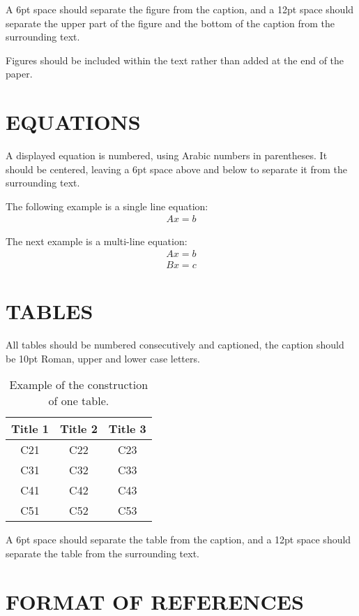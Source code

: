\documentclass{uncecomp2019}
\begin{document}
A 6pt space should separate the figure from the caption, and a 12pt space should
separate the upper part of the figure and the bottom of the caption from the
surrounding text.

Figures should be included within the text rather than added at the end of the
paper.

\section{EQUATIONS}

A displayed equation is numbered, using Arabic numbers in parentheses. It should
be centered, leaving a 6pt space above and below to separate it from the surrounding
text.

The following example is a single line equation:
\begin{eqnarray}
  Ax = b
\end{eqnarray}

The next example is a multi-line equation:
\begin{eqnarray}
  Ax = b \\
  Bx = c \nonumber
\end{eqnarray}

\section{TABLES}

All tables should be numbered consecutively and captioned, the caption should
be 10pt Roman, upper and lower case letters.

\begin{table}[h]
  \begin{center}
    \begin{tabular}{*{3}{c}}
    \hline
    Title 1 & Title 2 & Title 3 \\
    \hline
    C21 & C22 & C23 \\
    C31 & C32 & C33 \\
    C41 & C42 & C43 \\
    C51 & C52 & C53 \\
    \hline
    \end{tabular}
  \end{center}
\caption{Example of the construction of one table.}
\end{table}
A 6pt space should separate the table from the caption, and a 12pt space should
separate the table from the surrounding text.

\section{FORMAT OF REFERENCES}
\end{document}
